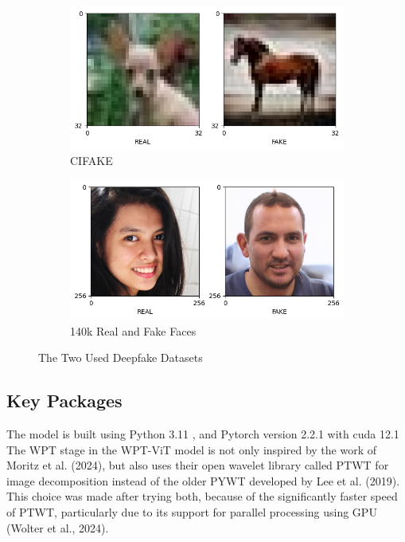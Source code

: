 \documentclass{svproc}
\begin{document}
\begin{figure}
  \centering
  \begin{subfigure}{.5\textwidth}
    \centering
    \includegraphics[width=0.9\linewidth]{figures/figure_01.png}
    \caption{CIFAKE}
    \label{fig:sub1}
  \end{subfigure}%
  \begin{subfigure}{.5\textwidth}
    \centering
    \includegraphics[width=0.9\linewidth]{figures/figure_02.png}
    \caption{140k Real and Fake Faces}
    \label{fig:sub2}
  \end{subfigure}
  \caption{The Two Used Deepfake Datasets}
  \label{fig:test}
\end{figure}
\pagebreak

\subsection{Key Packages}
The model is built using Python 3.11 , and Pytorch version 2.2.1 with cuda 12.1
The WPT stage in the WPT-ViT model is not only inspired by the work of Moritz
et al. (2024), but also uses their open wavelet library called PTWT for image
decomposition instead of the older PYWT developed by Lee et al. (2019). This
choice was made after trying both, because of the significantly faster speed of
PTWT, particularly due to its support for parallel processing using GPU (Wolter
et al., 2024).
\end{document}
